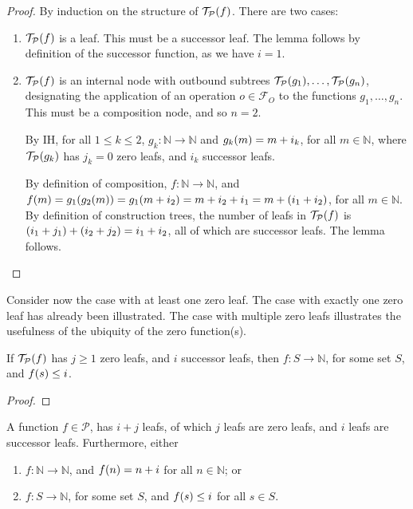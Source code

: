 \begin{proof} By induction on the structure of $\mathcal{T}_\mathcal{P}{\mathopen{}\left({f}\right)\mathclose{}}$.
There are two cases:\begin{enumerate}[label=(\arabic*)]

\item $\mathcal{T}_\mathcal{P}{\mathopen{}\left({f}\right)\mathclose{}}$ is a leaf. This must be a successor leaf.
The lemma follows by definition of the successor function, as we have $i = 1$.

\item $\mathcal{T}_\mathcal{P}{\mathopen{}\left({f}\right)\mathclose{}}$ is an internal node with outbound subtrees
$\mathcal{T}_\mathcal{P}{\mathopen{}\left({g_1}\right)\mathclose{}},\ldots,\mathcal{T}_\mathcal{P}{\mathopen{}\left({g_n}\right)\mathclose{}}$,
designating the application of an operation $o \in \mathcal{F}_O$ to the
functions $g_1,\ldots,g_n$. This must be a composition node, and so $n=2$.

By IH, for all $1 \leq k \leq 2$, $g_k : \mathbb{N} \rightarrow \mathbb{N}$ and
$g_k{\mathopen{}\left({m}\right)\mathclose{}} = m + i_k$, for all $m \in \mathbb{N}$, where
$\mathcal{T}_\mathcal{P}{\mathopen{}\left({g_k}\right)\mathclose{}}$ has $j_k = 0$ zero leafs, and $i_k$ successor
leafs.

By definition of composition, $f : \mathbb{N} \rightarrow \mathbb{N}$, and
$f{\mathopen{}\left({m}\right)\mathclose{}}=g_1{\mathopen{}\left({g_2{\mathopen{}\left({m}\right)\mathclose{}}}\right)\mathclose{}} = g_1{\mathopen{}\left({m + i_2}\right)\mathclose{}} = m + i_2 + i_1 = m + {\mathopen{}\left({i_1 + i_2}\right)\mathclose{}}$,
for all $m \in \mathbb{N}$.  By definition of construction trees, the number of
leafs in $\mathcal{T}_\mathcal{P}{\mathopen{}\left({f}\right)\mathclose{}}$ is ${\mathopen{}\left({i_1 + j_1}\right)\mathclose{}} + {\mathopen{}\left({i_2 + j_2}\right)\mathclose{}} = i_1
+ i_2$, all of which are successor leafs.  The lemma
follows.\end{enumerate}\end{proof}

Consider now the case with at least one zero leaf. The case with exactly one
zero leaf has already been illustrated. The case with multiple zero leafs
illustrates the usefulness of the ubiquity of the zero function(s).

\begin{lemma} \label{lem:p-at-least-one-zero} If $\mathcal{T}_\mathcal{P}{\mathopen{}\left({f}\right)\mathclose{}}$
has $j \geq 1$ zero leafs, and $i$ successor leafs, then $f : S \rightarrow
\mathbb{N}$, for some set $S$, and $f{\mathopen{}\left({s}\right)\mathclose{}} \leq i$. \end{lemma}

\begin{proof} \end{proof}

\begin{theorem} A function $f \in \mathcal{P}$, has $i+j$ leafs, of which $j$
leafs are zero leafs, and $i$ leafs are successor leafs. Furthermore,
either\begin{enumerate}[label=(\arabic*)]

\item $f : \mathbb{N} \rightarrow \mathbb{N}$, and $f{\mathopen{}\left({n}\right)\mathclose{}} = n+i$ for all $n
\in \mathbb{N}$; or

\item $f : S \rightarrow \mathbb{N}$, for some set $S$, and $f{\mathopen{}\left({s}\right)\mathclose{}} \leq i$ for
all $s \in S$.

\end{enumerate}\end{theorem}

